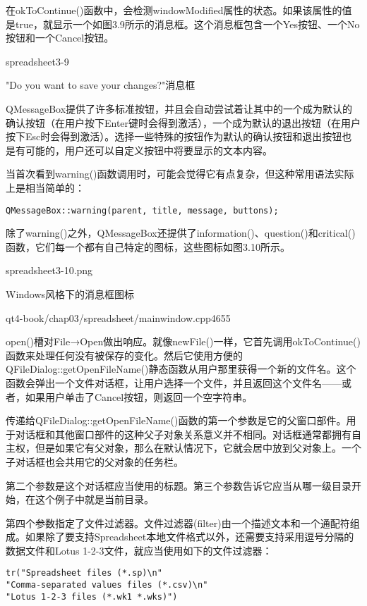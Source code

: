 \documentclass[11pt,oneside]{book}
\begin{document}
\begin{common-format}
在okToContinue()函数中，会检测windowModified属性的状态。如果该属性的值是true，就显示一个如图3.9所示的消息框。这个消息框包含一个Yes按钮、一个No按钮和一个Cancel按钮。
\begin{linefig}[0.8]{spreadsheet3-9}
\caption{"Do you want to save your changes?"消息框}
\label{fig:spreadsheet3-9}
\end{linefig}

QMessageBox提供了许多标准按钮，并且会自动尝试着让其中的一个成为默认的确认按钮（在用户按下Enter键时会得到激活），一个成为默认的退出按钮（在用户按下Esc时会得到激活）。选择一些特殊的按钮作为默认的确认按钮和退出按钮也是有可能的，用户还可以自定义按钮中将要显示的文本内容。

当首次看到warning()函数调用时，可能会觉得它有点复杂，但这种常用语法实际上是相当简单的：
\begin{Verbatim}
QMessageBox::warning(parent, title, message, buttons);
\end{Verbatim}

除了warning()之外，QMessageBox还提供了information()、question()和critical()函数，它们每一个都有自己特定的图标，这些图标如图3.10所示。
\begin{linefig}[0.8]{spreadsheet3-10.png}
\caption{Windows风格下的消息框图标}
\label{fig:spreadsheet3-10.png}
\end{linefig}

\begin{cppline}{qt4-book/chap03/spreadsheet/mainwindow.cpp}{46}{55}
\end{cppline}

open()槽对File→Open做出响应。就像newFile()一样，它首先调用okToContinue()函数来处理任何没有被保存的变化。然后它使用方便的QFileDialog::getOpenFileName()静态函数从用户那里获得一个新的文件名。这个函数会弹出一个文件对话框，让用户选择一个文件，并且返回这个文件名——或者，如果用户单击了Cancel按钮，则返回一个空字符串。

传递给QFileDialog::getOpenFileName()函数的第一个参数是它的父窗口部件。用于对话框和其他窗口部件的这种父子对象关系意义并不相同。对话框通常都拥有自主权，但是如果它有父对象，那么在默认情况下，它就会居中放到父对象上。一个子对话框也会共用它的父对象的任务栏。

第二个参数是这个对话框应当使用的标题。第三个参数告诉它应当从哪一级目录开始，在这个例子中就是当前目录。

第四个参数指定了文件过滤器。文件过滤器(filter)由一个描述文本和一个通配符组成。如果除了要支持Spreadsheet本地文件格式以外，还需要支持采用逗号分隔的数据文件和Lotus 1-2-3文件，就应当使用如下的文件过滤器：
\begin{Verbatim}
tr("Spreadsheet files (*.sp)\n"
"Comma-separated values files (*.csv)\n"
"Lotus 1-2-3 files (*.wk1 *.wks)")
\end{Verbatim}


\end{common-format}
\end{document}
